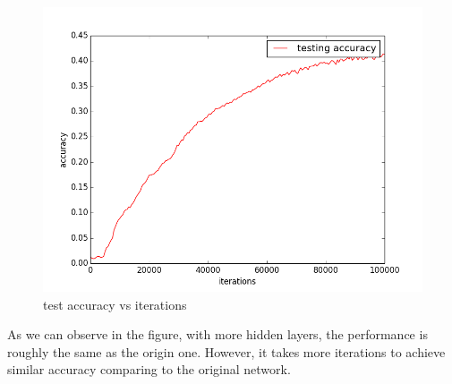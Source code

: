 \documentclass{article} %
\begin{document}
\begin{figure}[H]
    \centering
    \includegraphics[scale=0.4]{MoreLayer.png}
    \caption{test accuracy vs iterations}
\end{figure}
As we can observe in the figure, with more hidden layers, the performance is roughly the same as the origin one. However, it takes more iterations to achieve similar accuracy comparing to the original network.
\end{document}
